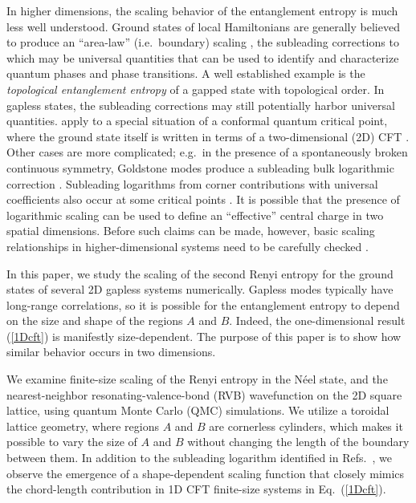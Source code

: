 \documentclass[prl,aps,twocolumn,floatfix,amsmath,amssymb,superscriptaddress,tightenlines]{revtex4}
\begin{document}
In higher dimensions, the scaling behavior of the entanglement entropy
is much less well understood.  Ground states of local Hamiltonians are
generally believed to produce an ``area-law'' (i.e.\ boundary) scaling
\cite{ALreview}, the subleading corrections to which may be universal
quantities that can be used to identify and characterize quantum
phases and phase transitions.  A well established example is the {\it
topological entanglement entropy} \cite{Alioscia1,Alioscia2,KP,LW} of
a gapped state with topological order.  In gapless states, the
subleading corrections may still potentially harbor universal
quantities.  %
apply to a special situation of a conformal quantum critical point,
where the ground state itself is written in terms of a two-dimensional
(2D) CFT \cite{Moore06,Hsu08,Misguich}.  Other cases are more
complicated; e.g.\ in the presence of a spontaneously broken
continuous symmetry, Goldstone modes produce a subleading bulk
logarithmic correction \cite{HeisLog,MaxLog}.  Subleading logarithms
from corner contributions with universal coefficients also occur at
some critical points \cite{Moore06,logcorner,Max}.  It is possible
that the presence of logarithmic scaling can be used to define an
``effective'' central charge in two spatial dimensions.  Before such
claims can be made, however, basic scaling relationships in
higher-dimensional systems need to be carefully checked \cite{EE_CFT}.

In this paper, we study the scaling of the second Renyi entropy for
the ground states of several 2D gapless systems numerically. Gapless
modes typically have long-range correlations, so it is possible for
the entanglement entropy to depend on the size and shape of the
regions $A$ and $B$. Indeed, the one-dimensional result
(\ref{1Dcft}) is manifestly size-dependent. The purpose of this
paper is to show how similar behavior occurs in two dimensions.

We examine finite-size scaling of the Renyi entropy in the N\'eel state, and the nearest-neighbor resonating-valence-bond (RVB) wavefunction
on the 2D square lattice, using quantum Monte Carlo (QMC) simulations.
We utilize a toroidal lattice geometry, where regions $A$ and $B$ are cornerless cylinders, which makes it possible to vary the size of $A$ and $B$ without changing the length of the boundary between them. 
In addition to the subleading logarithm identified in Refs.~\cite{HeisLog,MaxLog},
we observe the emergence of a shape-dependent scaling function that closely mimics the chord-length contribution in 1D CFT finite-size systems in Eq.~(\ref{1Dcft}).
\end{document}
